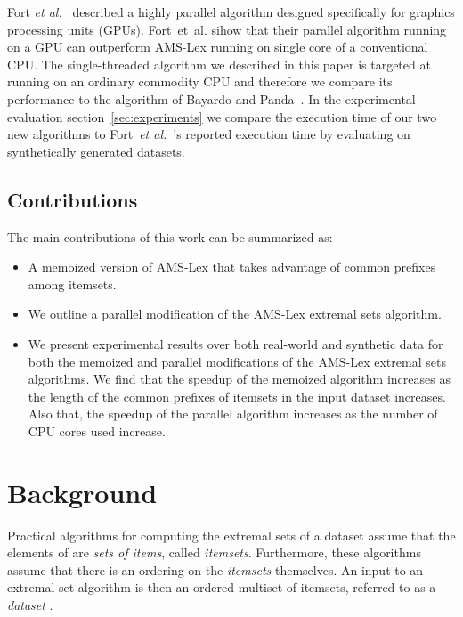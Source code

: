 \documentclass[13pt,a4paper]{article}
\begin{document}
Fort \textit{et al.}~\cite{Fort+13} described a highly parallel algorithm designed specifically for graphics processing units (GPUs). Fort~et~al. sihow that their parallel algorithm running on a GPU can outperform AMS-Lex running on single core of a conventional CPU. The single-threaded algorithm we described in this paper is targeted at running on an ordinary commodity CPU and therefore we compare its performance to the algorithm of Bayardo and Panda~\cite{BayardoPanda11}. In the experimental evaluation section~\ref{sec:experiments} we compare the execution time of our two new algorithms to Fort~\textit{et al.}~\cite{Fort+13}'s reported execution time by evaluating on synthetically generated datasets.

\subsection{Contributions}
\label{sec:intro:contributions}
The main contributions of this work can be summarized as:

\begin{itemize}
	\item A memoized version of AMS-Lex that takes advantage of common prefixes among itemsets.
    \item We outline a parallel modification of the AMS-Lex extremal sets algorithm.
    \item We present experimental results over both real-world and synthetic data for both the memoized and parallel modifications of the AMS-Lex extremal sets algorithms. We find that the speedup of the memoized algorithm increases as the length of the common prefixes of itemsets in the input dataset increases. Also that, the speedup of the parallel algorithm increases as the number of CPU cores used increase. 
\end{itemize}



\section{Background}
\label{sec:background}

Practical algorithms for computing the extremal sets of a dataset  assume that the elements of  are \textit{sets of items}, called \textit{itemsets}. Furthermore, these algorithms assume that there is an ordering on the \textit{itemsets} themselves. An input to an extremal set algorithm is then an ordered multiset of itemsets, referred to as a \textit{dataset} .
\end{document}
